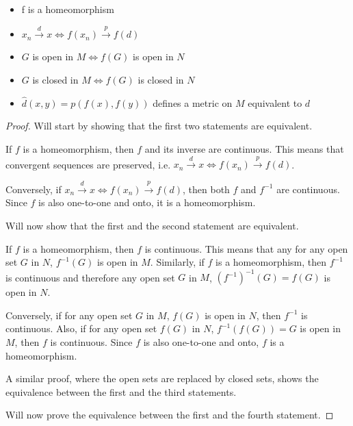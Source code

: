 \begin{itemize}
    \item f is a homeomorphism
    \item $x_n \xrightarrow{d} x \Leftrightarrow f(x_n) \xrightarrow{p} f(d)$
    \item $G$ is open in $M \Leftrightarrow f(G)$ is open in $N$
    \item $G$ is closed in $M \Leftrightarrow f(G)$ is closed in $N$
    \item $\hat{d}(x,y)=p(f(x), f(y))$ defines a metric on $M$ equivalent to $d$
\end{itemize}

\begin{proof}

Will start by showing that the first two statements are equivalent.

If $f$ is a homeomorphism, then $f$ and its inverse are continuous. This means that convergent sequences are preserved, i.e. $x_n \xrightarrow{d} x \Leftrightarrow f(x_n) \xrightarrow{p} f(d)$.

Conversely, if $x_n \xrightarrow{d} x \Leftrightarrow f(x_n) \xrightarrow{p} f(d)$, then both $f$ and $f^{-1}$ are continuous. Since $f$ is also one-to-one and onto, it is a homeomorphism.

\vspace{1em}

Will now show that the first and the second statement are equivalent. 

If $f$ is a homeomorphism, then $f$ is continuous. This means that any for any open set $G$ in $N$, $f^{-1}(G)$ is open in $M$. Similarly, if $f$ is a homeomorphism, then $f^{-1}$ is continuous and therefore any open set $G$ in $M$, $(f^{-1})^{-1}(G) = f(G)$ is open in $N$.

Conversely, if for any open set $G$ in $M$, $f(G)$ is open in $N$, then $f^{-1}$ is continuous. Also, if for any open set $f(G)$ in $N$, $f^{-1}(f(G))=G$ is open in $M$, then $f$ is continuous. Since $f$ is also one-to-one and onto, $f$ is a homeomorphism.

\vspace{1em}

A similar proof, where the open sets are replaced by closed sets, shows the equivalence between the first and the third statements.

\vspace{1em}

Will now prove the equivalence between the first and the fourth statement.


\end{proof}
